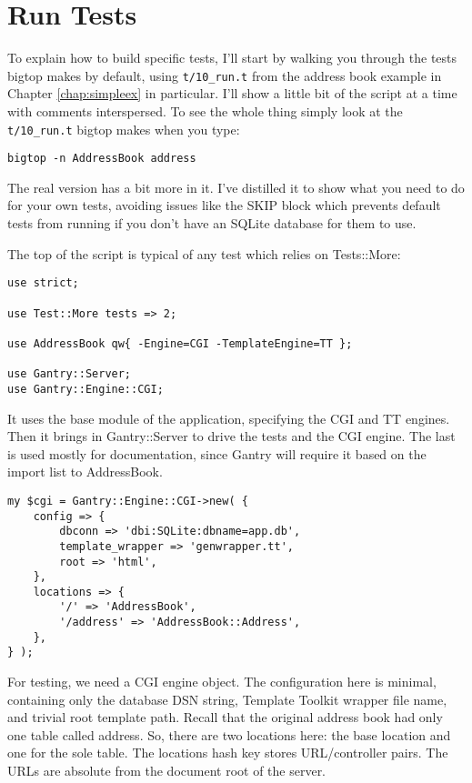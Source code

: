 \section{Run Tests}

To explain how to build specific tests, I'll start by walking you through
the tests bigtop makes by default, using \verb+t/10_run.t+ from the
address book example in Chapter \ref{chap:simpleex} in particular.  I'll
show a little bit of the script at a time with comments interspersed.
To see the whole thing simply look at the \verb+t/10_run.t+ bigtop makes
when you type:

\begin{verbatim}
bigtop -n AddressBook address
\end{verbatim}

The real version has a bit more in it.  I've distilled it to show what
you need to do for your own tests, avoiding issues like the SKIP block
which prevents default tests from running if you don't have an SQLite
database for them to use.

The top of the script is typical of any test which relies on Tests::More:

\begin{verbatim}
use strict;

use Test::More tests => 2;

use AddressBook qw{ -Engine=CGI -TemplateEngine=TT };

use Gantry::Server;
use Gantry::Engine::CGI;
\end{verbatim}

It uses the base module of the application, specifying the CGI and TT
engines.  Then it brings in Gantry::Server to drive the tests and the
CGI engine.  The last is used mostly for documentation, since Gantry will
require it based on the import list to AddressBook.

\begin{verbatim}
my $cgi = Gantry::Engine::CGI->new( {
    config => {
        dbconn => 'dbi:SQLite:dbname=app.db',
        template_wrapper => 'genwrapper.tt',
        root => 'html',
    },
    locations => {
        '/' => 'AddressBook',
        '/address' => 'AddressBook::Address',
    },
} );
\end{verbatim}

For testing, we need a CGI engine object.  The configuration here is minimal,
containing only the database DSN string, Template Toolkit wrapper file name,
and trivial root template path.  Recall that the original address book
had only one table called address.  So, there are two locations here: the
base location and one for the sole table.  The locations hash key
stores URL/controller pairs.  The URLs are absolute from the document
root of the server.


